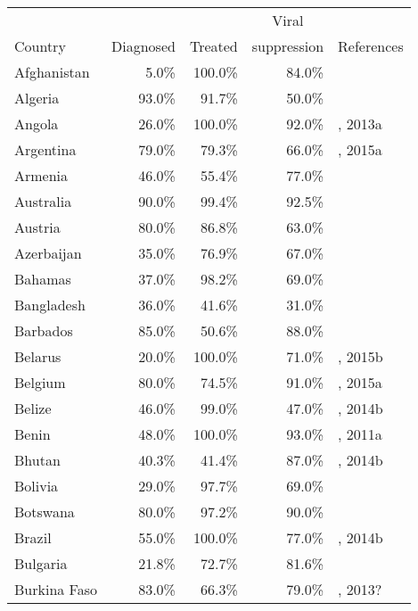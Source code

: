 \begin{longtable}{lrrrl}
  \hline
  & & & \multicolumn{1}{c}{Viral} \\
  Country & \multicolumn{1}{l}{Diagnosed}
  & \multicolumn{1}{l}{Treated} & \multicolumn{1}{l}{suppression}
  & References \\
  \hline
  Afghanistan & 5.0\% & 100.0\% & 84.0\% & \cite{Unaids2016-an} \\
  Algeria & 93.0\% & 91.7\% & 50.0\% & \cite{Unaids2016-an} \\
  Angola & 26.0\% & 100.0\% & 92.0\% & \cite{Unaids2016-an}, 2013a \\
  Argentina & 79.0\% & 79.3\% & 66.0\% & \cite{Unaids2016-an}, 2015a \\
  Armenia & 46.0\% & 55.4\% & 77.0\% & \cite{Unaids2016-an} \\
  Australia & 90.0\% & 99.4\% & 92.5\% & \cite{Unaids2016-an, kirby2014}  \\
  Austria & 80.0\% & 86.8\% & 63.0\% & \cite{ahivcos2015} \\
  Azerbaijan & 35.0\% & 76.9\% & 67.0\% & \cite{Unaids2016-an} \\
  Bahamas & 37.0\% & 98.2\% & 69.0\% & \cite{Unaids2016-an} \\
  Bangladesh & 36.0\% & 41.6\% & 31.0\% & \cite{Unaids2016-an} \\
  Barbados & 85.0\% & 50.6\% & 88.0\% & \cite{Unaids2016-an} \\
  Belarus & 20.0\% & 100.0\% & 71.0\% & \cite{Unaids2016-an}, 2015b \\
  Belgium & 80.0\% & 74.5\% & 91.0\% & \cite{Unaids2016-an,europa2012}, 2015a \\
  Belize & 46.0\% & 99.0\% & 47.0\% & \cite{Unaids2016-an}, 2014b \\
  Benin & 48.0\% & 100.0\% & 93.0\% & \cite{Unaids2016-an}, 2011a \\
  Bhutan & 40.3\% & 41.4\% & 87.0\% & \cite{Unaids2016-an, Unaids2016-am}, 2014b \\
  Bolivia & 29.0\% & 97.7\% & 69.0\% & \cite{Unaids2016-an} \\
  Botswana & 80.0\% & 97.2\% & 90.0\% & \cite{Unaids2016-an} \\
  Brazil & 55.0\% & 100.0\% & 77.0\% & \cite{Unaids2016-an}, 2014b \\
  Bulgaria & 21.8\% & 72.7\% & 81.6\% & \cite{Unaids2016-an, Unaids2016-am}\\
  Burkina Faso & 83.0\% & 66.3\% & 79.0\% & \cite{Unaids2016-an}, 2013? \\

\end{longtable}
